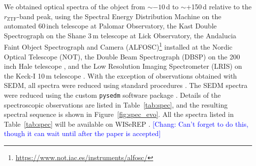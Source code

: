 \documentclass[twocolumn]{aastex631}
\newcommand{\chang}[1]{\textcolor{blue}{[Chang: #1]}}
\begin{document}
We obtained optical spectra of the object from $\sim$$-10$\,d to $\sim$+150\,d relative to the $r_\mathrm{ZTF}$-band peak, using the Spectral Energy Distribution Machine \citep[SEDM;][]{SEDM_2018} on the automated 60\,inch telescope \citep[P60;][]{P60_2006} at Palomar Observatory, the Kast Double Spectrograph \citep{miller1994kast} on the Shane 3\,m telescope at Lick Observatory, the Andalucia Faint Object Spectrograph and Camera (ALFOSC)\footnote{\url{https://www.not.iac.es/instruments/alfosc/}} installed at the Nordic Optical Telescope (NOT), the Double Beam Spectrograph (DBSP) on the 200\,inch Hale telescope \citep[P200;][]{P200_1982}, and the Low Resolution Imaging Spectrometer (LRIS) on the Keck-I 10\,m telescope \citep{Keck_1995}. With the exception of observations obtained with SEDM, all spectra were reduced using standard procedures \citep[e.g.,][]{Matheson_2000}. The SEDM spectra were reduced using the custom \texttt{pysedm} software package \citep{Rigault_pysedm_2019}. Details of the spectroscopic observations are listed in Table~\ref{tab:spec}, and the resulting spectral sequence is shown in Figure~\ref{fig:spec_evo}. All the spectra listed in Table~\ref{tab:spec} will be available on WISeREP \citep{wiserep_2012}. \chang{Can't forget to do this, though it can wait until after the paper is accepted}
\end{document}
